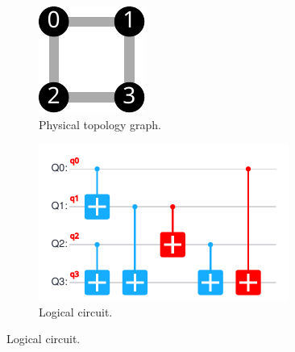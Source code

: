 \begin{figure}
	\centering
	\begin{subfigure}{0.1\textwidth}
		\centering
		\includegraphics[width=\textwidth]{8.2_figures/example_topo}
		\caption{Physical topology graph.}
	\end{subfigure}
	\begin{subfigure}{0.3\textwidth}
		\centering
		\includegraphics[width=0.9\textwidth]{8.2_figures/example_original}
		\caption{Logical circuit.}
	\end{subfigure}
	

\end{figure}
